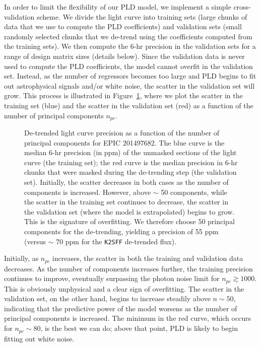 \documentclass[]{emulateapj}
\begin{document}
In order to limit the flexibility of our PLD model, we implement a simple cross-validation
scheme. We divide the light curve into training sets (large chunks of data that we use to compute the PLD
coefficients) and validation sets (small randomly selected chunks that we de-trend using the coefficients
computed from the training sets). We then compute the 6-hr precision in the validation
sets for a range of design matrix sizes (details below). Since the validation data is never used
to compute the PLD coefficients, the model cannot overfit in the validation set. Instead,
as the number of regressors becomes too large and PLD begins to fit out astrophysical
signals and/or white noise, the scatter in the validation set will grow.
This process is illustrated in Figure~\ref{fig:scatter}, where we plot the scatter in 
the training set (blue) and the scatter in the validation set (red) as a function of
the number of principal components $n_{pc}$.

\begin{figure}[h]
  \begin{center}
       \caption{De-trended light curve precision as a function of the number of principal
                components for EPIC 201497682. The blue curve is the median
                6-hr precision (in ppm) of the unmasked sections of the light curve (the training set); 
                the red curve is the median 
                precision in 6-hr chunks that were masked during the de-trending step
                (the validation set).
                Initially, the scatter decreases in both cases as the 
                number of components is increased. However, above $\sim$ 50 components, while the
                scatter in the training set continues to decrease, the scatter in the validation set (where 
                the model is extrapolated) begins to grow. This is the signature
                of overfitting. We therefore choose 50 principal components for the
                de-trending, yielding a precision of 55 ppm (versus $\sim$ 70 ppm for the
                \texttt{K2SFF} de-trended flux).}
     \label{fig:scatter}
  \end{center}
\end{figure}

Initially, as $n_{pc}$ increases, the scatter in both the training and validation data
decreases. As the number of components increases further, the training precision continues to improve,
eventually surpassing the photon noise limit for $n_{pc} \gtrsim 1000$. This is obviously unphysical and a
clear sign of overfitting. The scatter in the validation set, on the other hand, begins to increase steadily above $n \sim 50$,
indicating that the predictive power of the model worsens as the number of principal components is increased.
The minimum in the red curve, which occurs for $n_{pc} \sim 80$, is the best we can do; above that point, PLD
is likely to begin fitting out white noise.
\end{document}
